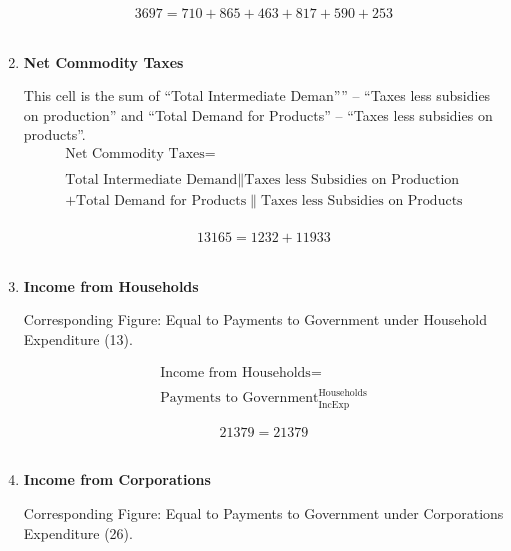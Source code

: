 \begin{enumerate}
\begin{equation} \nonumber
3697 = 710+865+463+817+590+253
\end{equation}\\


\item \textbf {Net Commodity Taxes}

This cell is the sum of ``Total Intermediate Deman''” – ``Taxes less subsidies on production'' and ``Total Demand for Products'' – ``Taxes less subsidies on products''. \cite{ScotGov2013a}\\

\begin{equation}
\begin{split}
\text{Net Commodity Taxes} =  \\ \\
\text{Total Intermediate Demand}\|\text{Taxes less Subsidies on Production}\\
+\text{Total Demand for Products}\|\text{Taxes less Subsidies on Products}\\
\end{split} \label{eq:2.5.36}
\end{equation}

\begin{equation} \nonumber
13165 = 1232+11933
\end{equation}\\


\item \textbf {Income from Households}

Corresponding Figure: Equal to Payments to Government under Household Expenditure (13).

\begin{equation}
\begin{split}
\text{Income from Households} =  \\ \\
\text{Payments to Government}^\text{Households}_\text{IncExp}
\end{split} \label{eq:2.5.37}
\end{equation}

\begin{equation} \nonumber
21379 = 21379
\end{equation}\\


\item \textbf {Income from Corporations}

Corresponding Figure: Equal to Payments to Government under Corporations Expenditure (26).


\end{enumerate}
